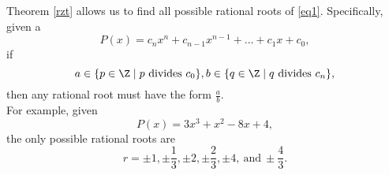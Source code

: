 \documentclass[math1010-lecture-notes]{subfiles}
\begin{document}
\begin{remark}
  Theorem \ref{rzt} allows us to find all possible rational roots of \ref{eq1}. Specifically, given
  a \[
    P(x) = c_nx^{n}+c_{n-1}x^{n-1}+\ldots+c_1x+c_0
  ,\] if \[
    a\in \{p \in \Z \mid p ~\text{divides}~ c_0\}, b\in \{q\in \Z\mid q ~\text{divides}~c_n\},
  \]
  then any rational root must have the form $\frac{a}{b}$.\\

  For example, given \[
    P(x) = 3x^3+x^2-8x+4
  ,\] the only possible rational roots are \[
    r = \pm 1, \pm \frac{1}{3}, \pm 2, \pm \frac{2}{3}, \pm 4, ~\text{and}~ \pm \frac{4}{3}
  .\] 
\end{remark}
\end{document}

